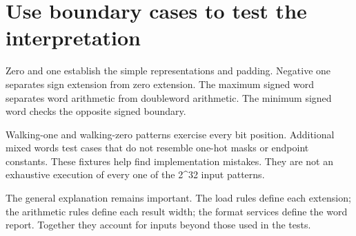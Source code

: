 \section{Use boundary cases to test the
  interpretation}\label{004-bit-inspector-p11-use-boundary-cases-to-test-the-interpretation}

Zero and one establish the simple representations and padding. Negative
one separates sign extension from zero extension. The maximum signed
word separates word arithmetic from doubleword arithmetic. The minimum
signed word checks the opposite signed boundary.

Walking-one and walking-zero patterns exercise every bit position.
Additional mixed words test cases that do not resemble one-hot masks or
endpoint constants. These fixtures help find implementation mistakes.
They are not an exhaustive execution of every one of the 2\^{}32 input
patterns.

The general explanation remains important. The load rules define each
extension; the arithmetic rules define each result width; the format
services define the word report. Together they account for inputs beyond
those used in the tests.
